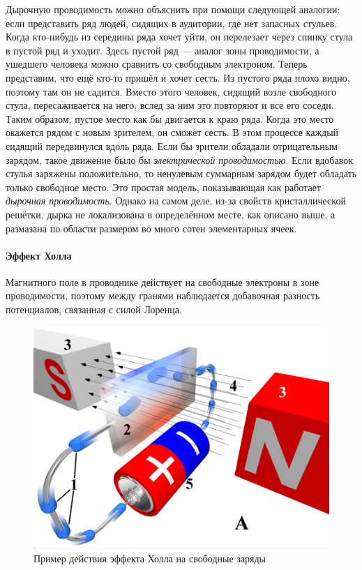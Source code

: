 \documentclass[a4paper, 12pt]{article}
\begin{document}
Дырочную проводимость можно объяснить при помощи следующей аналогии: если представить ряд людей, сидящих в аудитории, где нет запасных стульев. Когда кто-нибудь из середины ряда хочет уйти, он      перелезает через спинку стула в пустой ряд и уходит. Здесь пустой ряд — аналог зоны проводимости, а ушедшего человека можно сравнить со свободным электроном.
Теперь представим, что ещё кто-то пришёл и хочет сесть. Из пустого ряда плохо видно, поэтому там он не садится. Вместо этого человек, сидящий возле свободного стула, пересаживается на него, вслед за ним это повторяют и все его соседи. Таким образом, пустое место как бы двигается к краю ряда. Когда это место окажется рядом с новым зрителем, он сможет сесть.
В этом процессе каждый сидящий передвинулся вдоль ряда. Если бы зрители обладали отрицательным зарядом, такое движение было бы  \textit{электрической проводимостью}. Если вдобавок стулья заряжены положительно, то ненулевым суммарным зарядом будет обладать только свободное место. Это простая модель, показывающая как работает \textit{дырочная проводимость}. Однако на самом деле, из-за свойств кристаллической решётки, дырка не локализована в определённом месте, как описано выше, а размазана по области размером во много сотен элементарных ячеек.

\paragraph{Эффект Холла} 
Магнитного поле в проводнике действует на свободные электроны в зоне проводимости, поэтому между гранями наблюдается добавочная разность потенциалов, связанная с силой Лоренца. 


\begin {figure}[H]
	\begin{center}
		\includegraphics[width = 0.6 \textwidth]{Hall_effect}
		\caption{Пример действия эффекта Холла на свободные заряды}
	\end{center}
\end {figure}
\end{document}

